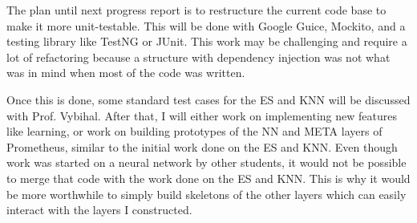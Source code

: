 \documentclass[]{article}
\begin{document}
	The plan until next progress report is to restructure the current code base to make it more unit-testable. This will be done with Google Guice, Mockito, and a testing library like TestNG or JUnit. This work may be challenging and require a lot of refactoring because a structure with dependency injection was not what was in mind when most of the code was written.
	
	Once this is done, some standard test cases for the ES and KNN will be discussed with Prof. Vybihal. After that, I will either work on implementing new features like learning, or work on building prototypes of the NN and META layers of Prometheus, similar to the initial work done on the ES and KNN. Even though work was started on a neural network by other students, it would not be possible to merge that code with the work done on the ES and KNN. This is why it would be more worthwhile to simply build skeletons of the other layers which can easily interact with the layers I constructed.
	
	
\end{document}
